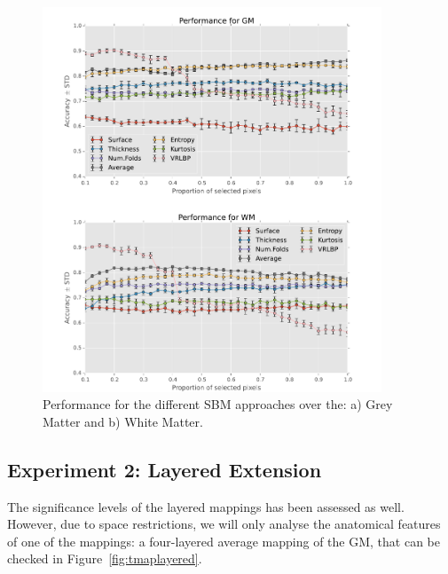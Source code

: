 \begin{figure}[htp]
	\centering
	\includegraphics[width=0.9\textwidth]{Graphics/ch6/10-comparisonPerformance}
	\caption{Performance for the different \ac{SBM} approaches over the: a) Grey Matter and b) White Matter.}
	\label{fig:figureGM}
\end{figure}

\subsection{Experiment 2: Layered Extension}
The significance levels of the layered mappings has been assessed as well. However, due to space restrictions, we will only analyse the anatomical features of one of the mappings: a four-layered average mapping of the \ac{GM}, that can be checked in Figure~\ref{fig:tmaplayered}.

